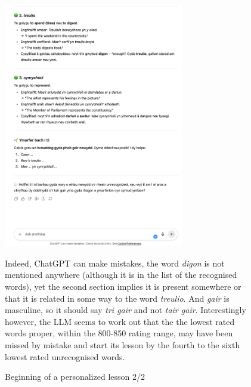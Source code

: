 \begin{figure}[h]
    \centering
    \includegraphics[width=0.7\textwidth]{figures/lesson-2.png}
    \caption{Beginning of a personalized lesson 2/2}
    \label{fig:lesson2}
    \medskip
    \small
    Indeed, ChatGPT can make mistakes, the word \textit{digon} is not mentioned anywhere (although it is in the list of the recognised words), yet the second section implies it is present somewhere or that it is related in some way to the word \textit{treulio}. And \textit{gair} is masculine, so it should say \textit{tri gair} and not \textit{tair gair}. Interestingly however, the LLM seems to work out that the the lowest rated words proper, within the 800-850 rating range, may have been missed by mistake and start its lesson by the fourth to the sixth lowest rated unrecognised words.
\end{figure}
